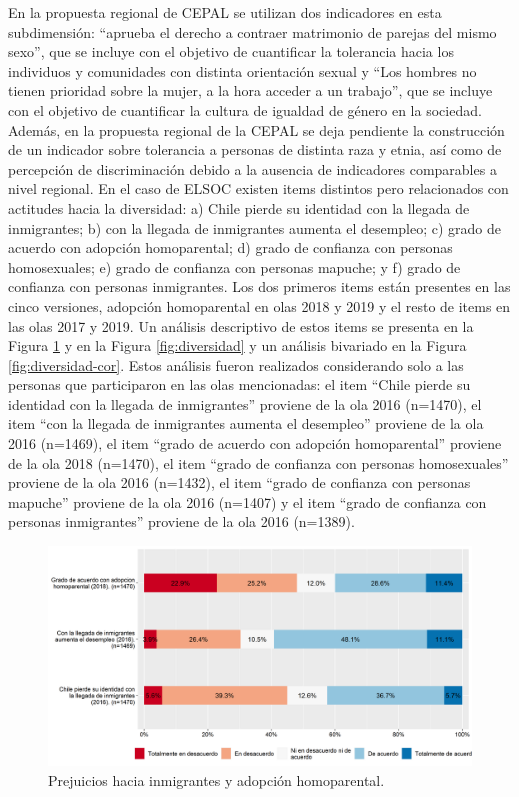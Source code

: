 \documentclass[
  12pt,
]{book}
\begin{document}
En la propuesta regional de CEPAL se utilizan dos indicadores en esta subdimensión: ``aprueba el derecho a contraer matrimonio de parejas del mismo sexo'', que se incluye con el objetivo de cuantificar la tolerancia hacia los individuos y comunidades con distinta orientación sexual y ``Los hombres no tienen prioridad sobre la mujer, a la hora acceder a un trabajo'', que se incluye con el objetivo de cuantificar la cultura de igualdad de género en la sociedad. Además, en la propuesta regional de la CEPAL se deja pendiente la construcción de un indicador sobre tolerancia a personas de distinta raza y etnia, así como de percepción de discriminación debido a la ausencia de indicadores comparables a nivel regional. En el caso de ELSOC existen items distintos pero relacionados con actitudes hacia la diversidad: a) Chile pierde su identidad con la llegada de inmigrantes; b) con la llegada de inmigrantes aumenta el desempleo; c) grado de acuerdo con adopción homoparental; d) grado de confianza con personas homosexuales; e) grado de confianza con personas mapuche; y f) grado de confianza con personas inmigrantes. Los dos primeros items están presentes en las cinco versiones, adopción homoparental en olas 2018 y 2019 y el resto de items en las olas 2017 y 2019. Un análisis descriptivo de estos items se presenta en la Figura \ref{fig:prejuicios} y en la Figura \ref{fig:diversidad} y un análisis bivariado en la Figura \ref{fig:diversidad-cor}. Estos análisis fueron realizados considerando solo a las personas que participaron en las olas mencionadas: el item ``Chile pierde su identidad con la llegada de inmigrantes'' proviene de la ola 2016 (n=1470), el item ``con la llegada de inmigrantes aumenta el desempleo'' proviene de la ola 2016 (n=1469), el item ``grado de acuerdo con adopción homoparental'' proviene de la ola 2018 (n=1470), el item ``grado de confianza con personas homosexuales'' proviene de la ola 2016 (n=1432), el item ``grado de confianza con personas mapuche'' proviene de la ola 2016 (n=1407) y el item ``grado de confianza con personas inmigrantes'' proviene de la ola 2016 (n=1389).

\begin{figure}[H]

{\centering \includegraphics[width=1\linewidth,height=1\textheight]{output/graphs/prejuicios} 

}

\caption{Prejuicios hacia inmigrantes y adopción homoparental.}\label{fig:prejuicios}
\end{figure}
\end{document}
